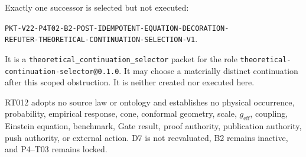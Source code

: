 \documentclass[11pt]{article}
\begin{document}
Exactly one successor is selected but not executed:
\begin{center}
\texttt{PKT-V22-P4T02-B2-POST-IDEMPOTENT-EQUATION-DECORATION-}\\
\texttt{REFUTER-THEORETICAL-CONTINUATION-SELECTION-V1}.
\end{center}
{\raggedright
It is a \texttt{theoretical\_continuation\_selector} packet for the role
\texttt{theoretical-continuation-selector@0.1.0}.  It may choose a materially
distinct continuation after this scoped obstruction.  It is neither created
nor executed here.\par}

RT012 adopts no source law or ontology and establishes no physical occurrence,
probability, empirical response, cone, conformal geometry, scale,
$g_{\mathrm{eff}}$, coupling, Einstein equation, benchmark, Gate result, proof
authority, publication authority, push authority, or external action.  D7 is
not reevaluated, B2 remains inactive, and P4--T03 remains locked.
\end{document}
